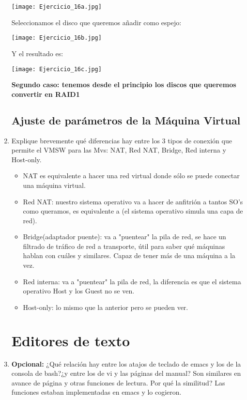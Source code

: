 \documentclass[paper=a4, fontsize=11pt]{scrartcl} %
\numberwithin{equation}{section} %
\numberwithin{figure}{section} %
\numberwithin{table}{section} %
\begin{document}
\begin{enumerate}
		\texttt{[image: Ejercicio\_16a.jpg]}
		
		Seleccionamos el disco que queremos añadir como espejo:
		
		\texttt{[image: Ejercicio\_16b.jpg]}
		
		Y el resultado es:
		
		\texttt{[image: Ejercicio\_16c.jpg]}
		
		\textbf{Segundo caso: tenemos desde el principio los discos que queremos convertir en RAID1}
		
		
	\subsection{Ajuste de parámetros de la Máquina Virtual}
		\item Explique brevemente qué diferencias hay entre los 3 tipos de conexión que permite el
		VMSW para las Mvs: NAT, Red NAT, Bridge, Red interna y Host-only.
		\begin{itemize}
			\item NAT es equivalente a hacer una red virtual donde sólo se puede conectar una máquina
			virtual.
			\item Red NAT: nuestro sistema operativo va a hacer de anfitrión a tantos SO's como
			queramos, es equivalente a (el sistema operativo simula una capa de red).
			\item Bridge(adaptador puente): va a "puentear" la pila de red, se hace un filtrado de
			tráfico de red a transporte, útil para saber qué máquinas hablan con cuáles y similares.
			Capaz de tener más de una máquina a la vez.
			\item Red interna: va a "puentear" la pila de red, la diferencia es que el sistema operativo
			Host y los Guest no se ven.
			\item Host-only: lo mismo que la anterior pero se pueden ver.
		\end{itemize}
		
	\section{Editores de texto}
		\item \textbf{Opcional:} ¿Qué relación hay entre los atajos de teclado de emacs y los de
		la consola de bash?¿y entre los de vi y las páginas del manual?
		Son similares en avance de página y otras funciones de lectura. Por qué la similitud? Las
		funciones estaban implementadas en emacs y lo cogieron.
		
		
\end{enumerate}
\end{document}
